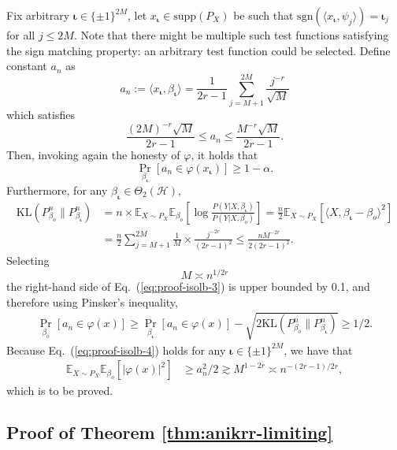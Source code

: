 \documentclass[11pt,a4paper]{article}
\newcommand{\vct}{\boldsymbol}
\theoremstyle{definition}
\theoremstyle{plain}
\theoremstyle{remark}
\newcommand{\supp}{\mathrm{supp}}
\newcommand{\mH}{\mathcal H}
\newcommand{\sgn}{\mathrm{sgn}}
\begin{document}
Fix arbitrary $\vct\iota\in\{\pm 1\}^{2M}$, let $x_{\vct\iota}\in\supp(P_X)$ be such that $\sgn(\langle x_{\vct\iota},\psi_j\rangle)=\vct\iota_j$ for all $j\leq 2M$.
Note that there might be multiple such test functions satisfying the sign matching property: an arbitrary test function could be selected.
Define constant $a_n$ as
$$
a_n := \langle x_{\vct\iota},\beta_{\vct\iota}\rangle = \frac{1}{2r-1}\sum_{j=M+1}^{2M}\frac{j^{-r}}{\sqrt{M}}
$$
which satisfies
\begin{equation}
\frac{(2M)^{-r}\sqrt{M}}{2r-1} \leq a_n \leq \frac{M^{-r}\sqrt{M}}{2r-1}.
\label{eq:proof-isolb-1half}
\end{equation}
Then, invoking again the honesty of $\varphi$, it holds that
\begin{equation}
\Pr_{\beta_{\vct\iota}}\left[a_n\in\varphi(x_{\vct\iota})\right] \geq 1-\alpha.
\label{eq:proof-isolb-2}
\end{equation}
Furthermore, for any $\beta_{\vct\iota}\in\Theta_2(\mH)$, 
\begin{align}
\mathrm{KL}(P_{\beta_o}^n\|P_{\beta_{\vct\iota}}^n) &= n\times \mathbb E_{X\sim P_X}\mathbb E_{\beta_o}\left[\log\frac{P(Y|X,\beta_{\vct\iota})}{P(Y|X,\beta_o)}\right]
= \frac{n}{2}\mathbb E_{X\sim P_X}[\langle X, \beta_{\vct\iota}-\beta_o\rangle^2]\nonumber\\
&= \frac{n}{2}\sum_{j=M+1}^{2M} \frac{1}{M}\times \frac{j^{-2r}}{(2r-1)^2} \leq \frac{nM^{-2r}}{2(2r-1)^2}.\label{eq:proof-isolb-3}
\end{align}
Selecting 
$$
M\asymp n^{1/2r}
$$
the right-hand side of Eq.~(\ref{eq:proof-isolb-3}) is upper bounded by 0.1, and therefore using Pinsker's inequality,
\begin{align}
\Pr_{\beta_o}[a_n\in\varphi(x)]\geq \Pr_{\beta_{\vct\iota}}[a_n\in\varphi(x)] - \sqrt{2\mathrm{KL}(P_{\beta_o}^n\|P_{\beta_{\vct\iota}}^n)} \geq 1/2.
\label{eq:proof-isolb-4}
\end{align}
Because Eq.~(\ref{eq:proof-isolb-4}) holds for any $\vct\iota\in\{\pm 1\}^{2M}$, we have that
\begin{align*}
\mathbb E_{X\sim P_X} \mathbb E_{\beta_o}[|\varphi(x)|^2] &\geq a_n^2/2 \gtrsim M^{1-2r} \asymp n^{-(2r-1)/2r},
\end{align*}
which is to be proved.


\subsection{Proof of Theorem \ref{thm:anikrr-limiting}}
\end{document}
